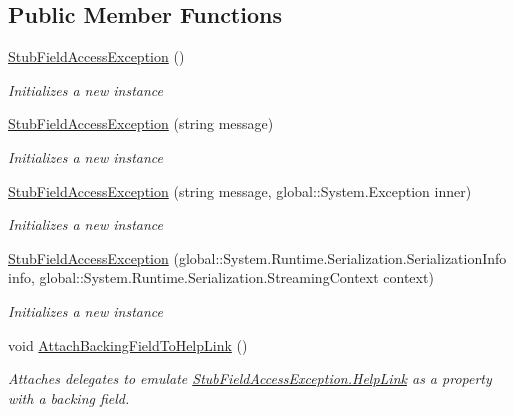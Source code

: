 \subsection*{Public Member Functions}
\begin{DoxyCompactItemize}
\item 
\hyperlink{class_system_1_1_fakes_1_1_stub_field_access_exception_a97650ba77f2c87f25b896357f16bde39}{Stub\-Field\-Access\-Exception} ()
\begin{DoxyCompactList}\small\item\em Initializes a new instance\end{DoxyCompactList}\item 
\hyperlink{class_system_1_1_fakes_1_1_stub_field_access_exception_accdb682ac3503181ff02644e041e83b2}{Stub\-Field\-Access\-Exception} (string message)
\begin{DoxyCompactList}\small\item\em Initializes a new instance\end{DoxyCompactList}\item 
\hyperlink{class_system_1_1_fakes_1_1_stub_field_access_exception_a98b0e37de8ef55f3cc871d4e0af1fba1}{Stub\-Field\-Access\-Exception} (string message, global\-::\-System.\-Exception inner)
\begin{DoxyCompactList}\small\item\em Initializes a new instance\end{DoxyCompactList}\item 
\hyperlink{class_system_1_1_fakes_1_1_stub_field_access_exception_a01fccdd343bed81b668af20524412bbd}{Stub\-Field\-Access\-Exception} (global\-::\-System.\-Runtime.\-Serialization.\-Serialization\-Info info, global\-::\-System.\-Runtime.\-Serialization.\-Streaming\-Context context)
\begin{DoxyCompactList}\small\item\em Initializes a new instance\end{DoxyCompactList}\item 
void \hyperlink{class_system_1_1_fakes_1_1_stub_field_access_exception_ad48d40ca506506912983d2e620397f4d}{Attach\-Backing\-Field\-To\-Help\-Link} ()
\begin{DoxyCompactList}\small\item\em Attaches delegates to emulate \hyperlink{class_system_1_1_fakes_1_1_stub_field_access_exception_ab8c002c8166c6be379f0a358fc087fb1}{Stub\-Field\-Access\-Exception.\-Help\-Link} as a property with a backing field.\end{DoxyCompactList}\item 

\end{DoxyCompactItemize}
